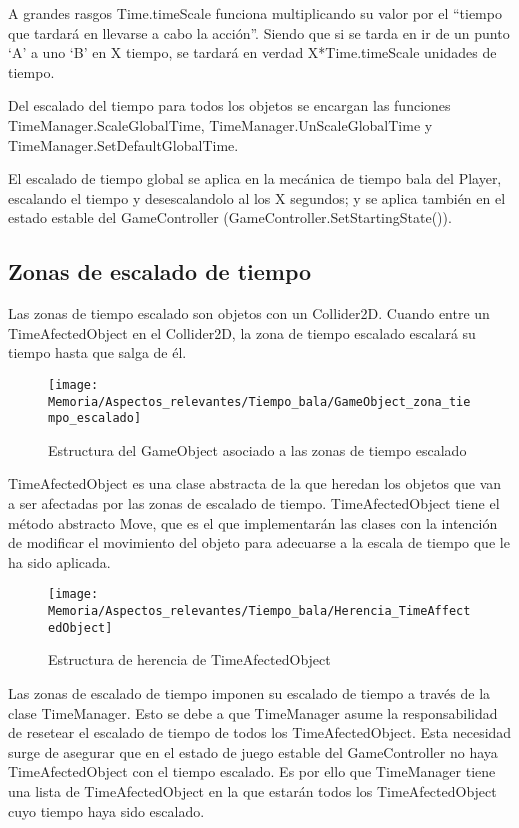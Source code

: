 A grandes rasgos Time.timeScale funciona multiplicando su valor por el “tiempo que tardará en llevarse a cabo la acción”. Siendo que si se tarda en ir de un punto ‘A’ a uno ‘B’ en X tiempo, se tardará en verdad X*Time.timeScale unidades de tiempo.

Del escalado del tiempo para todos los objetos se encargan las funciones TimeManager.ScaleGlobalTime, TimeManager.UnScaleGlobalTime y TimeManager.SetDefaultGlobalTime.

El escalado de tiempo global se aplica en la mecánica de tiempo bala del Player, escalando el tiempo y desescalandolo al los X segundos; y se aplica también en el estado estable del GameController (GameController.SetStartingState()).

\subsection{Zonas de escalado de tiempo}
Las zonas de tiempo escalado son objetos con un Collider2D. Cuando entre un TimeAfectedObject en el Collider2D, la zona de tiempo escalado escalará su tiempo hasta que salga de él.

\begin{figure}[h]
\texttt{[image: Memoria/Aspectos\_relevantes/Tiempo\_bala/GameObject\_zona\_tiempo\_escalado]}
\caption{Estructura del GameObject asociado a las zonas de tiempo escalado}
\end{figure}

TimeAfectedObject es una clase abstracta de la que heredan los objetos que van a ser afectadas por las zonas de escalado de tiempo. TimeAfectedObject tiene el método abstracto Move, que es el que implementarán las clases con la intención de modificar el movimiento del objeto para adecuarse a la escala de tiempo que le ha sido aplicada.

\clearpage
\begin{figure}[h]
\texttt{[image: Memoria/Aspectos\_relevantes/Tiempo\_bala/Herencia\_TimeAffectedObject]}
\caption{Estructura de herencia de TimeAfectedObject}
\end{figure}

Las zonas de escalado de tiempo imponen su escalado de tiempo a través de la clase TimeManager. Esto se debe a que TimeManager asume la responsabilidad de resetear el escalado de tiempo de todos los TimeAfectedObject. Esta necesidad surge de asegurar que en el estado de juego estable del GameController no haya TimeAfectedObject con el tiempo escalado. Es por ello que TimeManager tiene una lista de TimeAfectedObject en la que estarán todos los TimeAfectedObject cuyo tiempo haya sido escalado.

